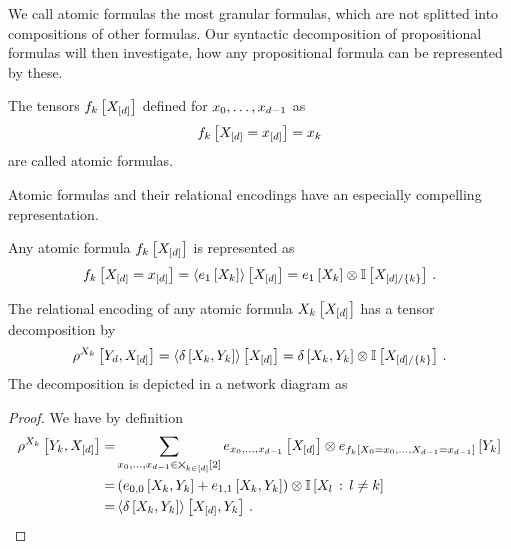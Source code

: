 
We call atomic formulas the most granular formulas, which are not splitted into compositions of other formulas.
Our syntactic decomposition of propositional formulas will then investigate, how any propositional formula can be represented by these.

\begin{definition}
	The tensors $f_{k}\left[X_{[d]}\right]$ defined for $x_{0},\ldots,x_{d-1}$ as
		\[ f_{k}\left[X_{[d]}=x_{[d]}\right] 
		= x_{k} \]
	are called atomic formulas.
\end{definition}

Atomic formulas and their relational encodings have an especially compelling representation.

\begin{theorem}
	Any atomic formula $f_{k}\left[X_{[d]}\right]$ is represented as
		\[ f_{k}\left[X_{[d]}=x_{[d]}\right] 
		= \left\langle e_1\left[X_{k}\right]\right\rangle \left[ X_{[d]} \right]
		= e_1\left[X_{k}\right] \otimes \mathbb{I}\left[X_{[d]/\{k\}}\right]  \, . \]	

	The relational encoding of any atomic formula $X_{k}\left[X_{[d]}\right]$ has a tensor decomposition by
		\[ \rho^{X_{k}}\left[Y_{d},X_{[d]}\right]
		= \left\langle \delta\left[X_{k},Y_{k}\right]\right\rangle \left[ X_{[d]} \right]
		= \delta\left[X_{k},Y_{k}\right] \otimes \mathbb{I}\left[X_{[d]/\{k\}}\right] \, . \]
	The decomposition is depicted in a network diagram as
	\begin{center}
		
	\end{center}
\end{theorem}
\begin{proof}
	We have by definition
	\begin{align*}
		\rho^{X_{k}}\left[Y_{k},X_{[d]}\right]
		=& \sum_{x_{0},\ldots,x_{d-1}\in\bigtimes_{k\in[d]}[2]} e_{x_{0},\ldots,x_{d-1}}\left[X_{[d]}\right] \otimes e_{f_{k}\left[X_{0}=x_{0},\ldots,X_{d-1}=x_{d-1}\right]}\left[Y_{k}\right] \\
		=& \left( e_{0,0}\left[X_{k},Y_{k}\right] +
		e_{1,1}\left[X_{k},Y_{k}\right] \right) \otimes \mathbb{I}\left[X_{l}\, : \, l \neq k\right] \\
		=& \left\langle \delta\left[X_{k},Y_{k}\right]\right\rangle \left[ X_{[d]},Y_{k} \right] \, .
	\end{align*} 
\end{proof}

